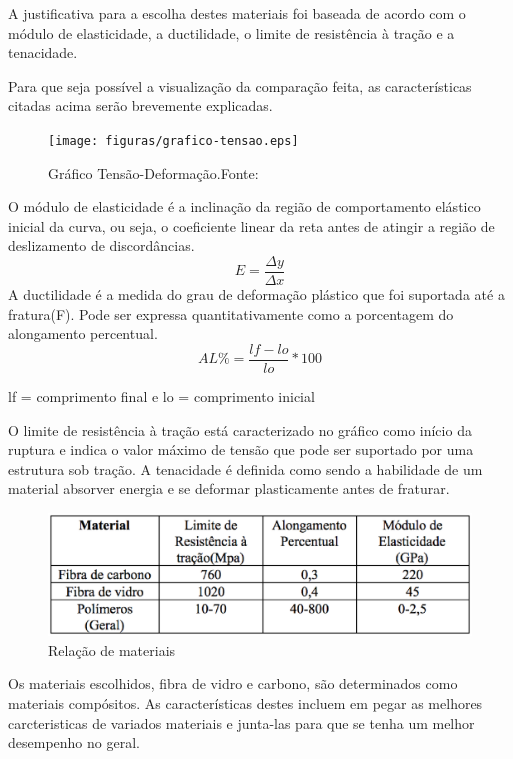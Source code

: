 A justificativa para a escolha destes materiais foi baseada de acordo com o módulo de elasticidade, a ductilidade, o limite de
resistência à tração e a tenacidade. 

Para que seja possível a visualização da comparação feita, as características citadas acima serão brevemente explicadas.


\begin{figure}[H]
    \centering
      \texttt{[image: figuras/grafico-tensao.eps]}
    \caption{Gráfico Tensão-Deformação.Fonte: \cite{callister}}
    \label{fig:grafico-tensao}
\end{figure}

O módulo de elasticidade é a inclinação da região de comportamento elástico inicial da curva, ou seja, o coeficiente linear da reta antes de atingir a região de deslizamento de discordâncias.
\begin{equation}
E =\frac{\Delta y}{\Delta x}
\end{equation}
A ductilidade é a medida do grau de deformação plástico que foi suportada até a fratura(F). Pode ser expressa quantitativamente como a porcentagem do alongamento percentual.
\begin{equation}
AL\% =\frac{lf - lo}{lo} * 100
\end{equation}
\begin{center}
lf = comprimento final e lo = comprimento inicial
\end{center}

O limite de resistência à tração está caracterizado no gráfico como início da ruptura e indica o valor máximo de tensão que pode ser suportado por uma estrutura sob tração.
A tenacidade é definida como sendo a habilidade de um material absorver energia e se deformar plasticamente antes de fraturar.

\begin{figure}[h]
    \centering
      \includegraphics[keepaspectratio=true,scale=0.7]{figuras/graficoRelacao.eps}
    \caption{ Relação de materiais}
    \label{fig:graficoRelacao}
\end{figure}

Os materiais escolhidos, fibra de vidro e carbono, são determinados como materiais compósitos. As características destes incluem em pegar as melhores carcteristicas de variados materiais e junta-las para que se tenha um melhor desempenho no geral. 

